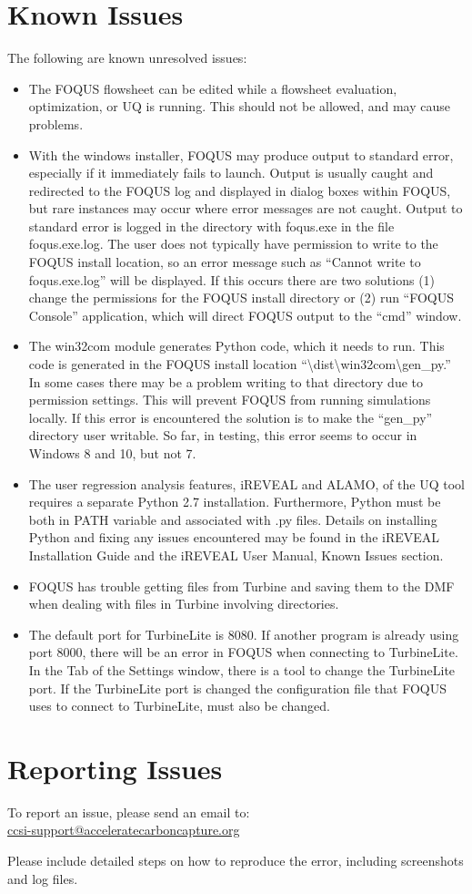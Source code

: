 \section{Known Issues}
The following are known unresolved issues:
\begin{itemize}
	\item The FOQUS flowsheet can be edited while a flowsheet evaluation, optimization, or UQ is running. This should not be allowed, and may cause problems.
	\item With the windows installer, FOQUS may produce output to standard error, especially if it immediately fails to launch. Output is usually caught and redirected to the FOQUS log and displayed in dialog boxes within FOQUS, but rare instances may occur where error messages are not caught.  Output to standard error is logged in the directory with foqus.exe in the file foqus.exe.log.  The user does not typically have permission to write to the FOQUS install location, so an error message such as ``Cannot write to foqus.exe.log'' will be displayed.  If this occurs there are two solutions (1) change the permissions for the FOQUS install directory or (2) run ``FOQUS Console'' application, which will direct FOQUS output to the ``cmd'' window.
	\item The win32com module generates Python code, which it needs to run.  This code is generated in the FOQUS install location ``\textbackslash dist\textbackslash win32com\textbackslash gen\_py.''  In some cases there may be a problem writing to that directory due to permission settings. This will prevent FOQUS from running simulations locally. If this error is encountered the solution is to make the ``gen\_py'' directory user writable.  So far, in testing, this error seems to occur in Windows 8 and 10, but not 7.
	\item The user regression analysis features, iREVEAL and
          ALAMO, of the UQ tool requires a separate Python 2.7
          installation. Furthermore, Python must be both in PATH
          variable and associated with .py files.  Details on
          installing Python and fixing any issues encountered may
          be found in the iREVEAL Installation Guide and the iREVEAL
          User Manual, Known Issues section.
        \item FOQUS has trouble getting files from Turbine and saving them to the DMF when dealing with files in Turbine involving directories.
        \item The default port for TurbineLite is 8080. If another program is already using port 8000, there will be an error in FOQUS when connecting to TurbineLite.  In the  Tab of the Settings window, there is a tool to change the TurbineLite port.  If the TurbineLite port is changed the configuration file that FOQUS uses to connect to TurbineLite, must also be changed.
\end{itemize}

\section{Reporting Issues}
To report an issue, please send an email to:\\
\textcolor{blue}{\uline{\href{mailto://ccsi-support@acceleratecarboncapture.org}{ccsi-support@acceleratecarboncapture.org}}}

Please include detailed steps on how to reproduce the error, including screenshots and log files.
